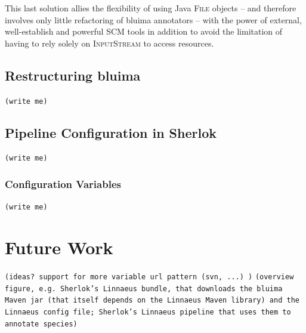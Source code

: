 \documentclass{article}
\newcommand{\id}[1]{\mbox{\textsc{#1}}}
\newcommand{\TODO}[1]{\texttt{\textcolor{YellowOrange}{(#1)}}} %
\begin{document}
This last solution allies the flexibility of using Java \id{File} objects -- and therefore involves only little refactoring of bluima annotators -- with the power of external, well-establish and powerful SCM tools in addition to avoid the limitation of having to rely solely on \id{InputStream} to access resources.

\subsection{Restructuring bluima}

\TODO{write me}

\subsection{Pipeline Configuration in Sherlok}

\TODO{write me}

\subsubsection{Configuration Variables}

\TODO{write me}

\section{Future Work}

\TODO{ideas? support for more variable url pattern (svn, ...) }
\TODO{overview figure, e.g.  Sherlok's Linnaeus bundle, that downloads the bluima Maven jar (that itself depends on the Linnaeus Maven library) and the Linnaeus config file; Sherlok's Linnaeus pipeline that uses them to annotate species}


\end{document}
